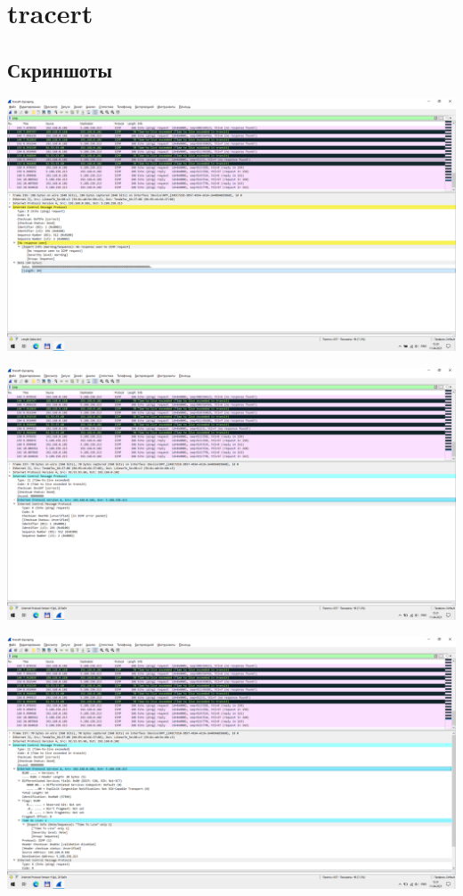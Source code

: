
\section{tracert}

\subsection{Скриншоты}

\begin{center}

    \includegraphics[width=\textwidth]{screenshots/tracert-d_ttl_request_1}

    \includegraphics[width=\textwidth]{screenshots/tracert-d_ttl_response_1}

    \includegraphics[width=\textwidth]{screenshots/tracert-d_ttl_response_2}


\end{center}
